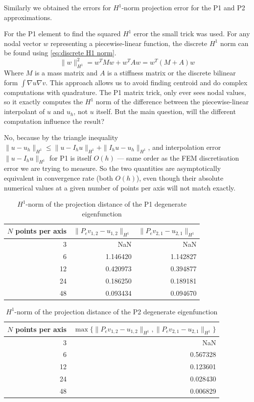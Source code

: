 \documentclass[conference]{IEEEtran}
\begin{document}
Similarly we obtained the errors for $H^1$-norm projection error for the P1 and P2 approximations.

For the P1 element to find the squared $H^1$ error the small trick was used. For any nodal vector $w$ representing a piecewise-linear function, the discrete $H^1$ norm can be found using \ref{eq:discrete H1 norm}.
\begin{equation}
    \|w\|_{H^1}^2 = w^T Mw + w^T Aw = w^T(M + A)w
    \label{eq:discrete H1 norm}
\end{equation}
Where $M$ is a mass matrix and $A$ is a stiffness matrix or the discrete bilinear form $\int\nabla u\nabla v$. This approach allows us to avoid finding centroid and do complex computations with quadrature.
The P1 matrix trick, only ever sees nodal values, so it exactly computes the $H^1$ norm of the difference between the piecewise-linear interpolant of $u$ and $u_h$, not $u$ itself. But the main question, will the different computation influence the result?

No, because by the triangle inequality $\|u - u_h\|_{H^1} \leq \|u - I_hu\|_{H^1} + \|I_hu - u_h\|_{H^1}$, and interpolation error $\|u - I_hu\|_{H^1}$ for P1 is itself $O(h)$ — same order as the FEM discretisation error we are trying to measure. So the two quantities are asymptotically equivalent in convergence rate (both $O(h)$), even though their absolute numerical values at a given number of points per axis will not match exactly.
\begin{table}[H]
    \centering
    \caption{$H^1$-norm of the projection distance of the P1 degenerate eigenfunction}
    \label{tab:H1 projection errors P1}
    \begin{tabular}{rrr}
        \toprule
        $N$ points per axis & $\|P_ev_{1,2} - u_{1,2}\|_{H^1}$ & $\|P_ev_{2,1} - u_{2,1}\|_{H^1}$ \\
        \midrule
        3 & NaN & NaN \\
        6 & 1.146420 & 1.142827 \\
        12 & 0.420973 & 0.394877 \\
        24 & 0.186250 & 0.189181 \\
        48 & 0.093434 & 0.094670 \\
        \bottomrule
    \end{tabular}
\end{table}
\begin{table}[H]
    \centering
    \caption{$H^1$-norm of the projection distance of the P2 degenerate eigenfunction}
    \label{tab:H1 projection errors P2}
    \begin{tabular}{rr}
        \toprule
        $N$ points per axis & $\max\{\|P_ev_{1,2} - u_{1,2}\|_{H^1}, \|P_ev_{2,1} - u_{2,1}\|_{H^1}\}$ \\
        \midrule
        3 & NaN \\
        6 & 0.567328 \\
        12 & 0.123601 \\
        24 & 0.028430 \\
        48 & 0.006829 \\
        \bottomrule
    \end{tabular}
\end{table}
\end{document}
